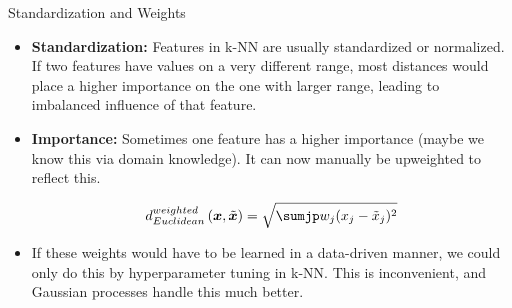 \documentclass[11pt,compress,t,notes=noshow, xcolor=table]{beamer}
\begin{document}
\begin{vbframe}{Standardization and Weights}


\begin{itemize}
  \item \textbf{Standardization:} Features in k-NN are usually standardized or normalized. If two features have values on a very different range, most distances would place a higher importance on the one with larger range, leading to imbalanced influence of that feature.
  \item \textbf{Importance:} Sometimes one feature has a higher importance (maybe we know this via domain knowledge). It can now manually be upweighted to reflect this.

$$d^{weighted}_{Euclidean}\left(\xv, \tilde{\xv}\right) = \sqrt{\sumjp w_{j}(x_j- \tilde{x}_j)^2}$$
  
  \item If these weights would have to be learned in a data-driven manner, 
    we could only do this by hyperparameter tuning in k-NN. This is inconvenient,
    and Gaussian processes handle this much better.
\end{itemize}

\end{vbframe}
\end{document}
